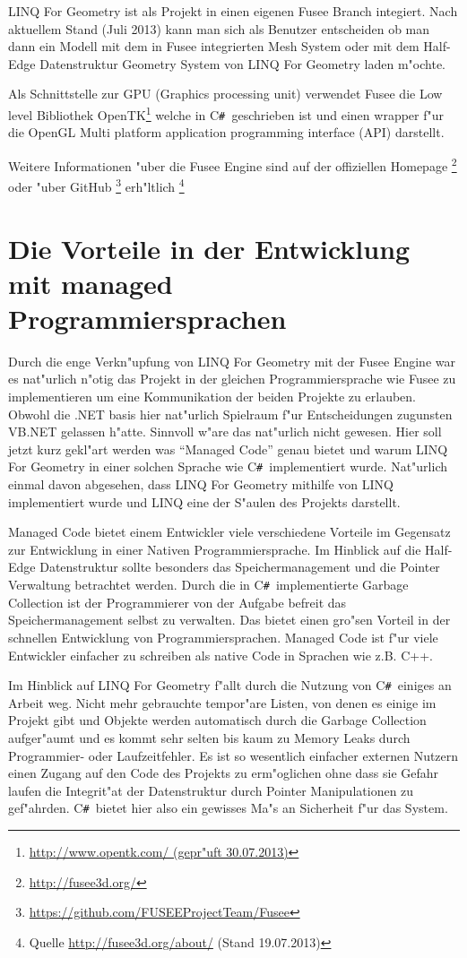 \documentclass[pagesize, paper=a4, fontsize=12pt,titlepage=true, headings=small, headnosepline, abstractoff, liststotoc, nochapterprefix, plainheadsepline]{scrreprt}
\newcommand{\CSS}{C\texttt{\# }}
\newcommand{\LFGS}{LINQ For Geometry }
\newcommand{\HES}{Half-Edge Datenstruktur }
\begin{document}
\LFGS ist als Projekt in einen eigenen Fusee Branch integiert. Nach aktuellem Stand (Juli 2013) kann man sich als Benutzer entscheiden ob man dann ein Modell mit dem in Fusee integrierten Mesh System oder mit dem \HES Geometry System von \LFGS laden m"ochte.

Als Schnittstelle zur GPU (Graphics processing unit) verwendet Fusee die Low level Bibliothek OpenTK\footnote{\url{http://www.opentk.com/ (gepr"uft 30.07.2013)}} welche in \CSS geschrieben ist und einen wrapper f"ur die OpenGL Multi platform application programming interface (API) darstellt.

Weitere Informationen "uber die Fusee Engine sind auf der offiziellen Homepage \footnote{\url{http://fusee3d.org/}} oder "uber GitHub \footnote{\url{https://github.com/FUSEEProjectTeam/Fusee}} erh"ltlich \footnote{Quelle \url{http://fusee3d.org/about/} (Stand 19.07.2013)}
\section {Die Vorteile in der Entwicklung mit managed Programmiersprachen}\label{sec:VorteileManaged}
Durch die enge Verkn"upfung von \LFGS mit der Fusee Engine war es nat"urlich n"otig das Projekt in der gleichen Programmiersprache wie Fusee zu implementieren um eine Kommunikation der beiden Projekte zu erlauben. Obwohl die .NET basis hier nat"urlich Spielraum f"ur Entscheidungen zugunsten VB.NET gelassen h"atte. Sinnvoll w"are das nat"urlich nicht gewesen. Hier soll jetzt kurz gekl"art werden was "`Managed Code"' genau bietet und warum \LFGS in einer solchen Sprache wie \CSS implementiert wurde. Nat"urlich einmal davon abgesehen, dass \LFGS mithilfe von LINQ implementiert wurde und LINQ eine der S"aulen des Projekts darstellt.

		Managed Code bietet einem Entwickler viele verschiedene Vorteile im Gegensatz zur Entwicklung in einer Nativen Programmiersprache. Im Hinblick auf die \HES sollte besonders das Speichermanagement und die Pointer Verwaltung betrachtet werden. Durch die in \CSS implementierte Garbage Collection ist der Programmierer von der Aufgabe befreit das Speichermanagement selbst zu verwalten. Das bietet einen gro"sen Vorteil in der schnellen Entwicklung von Programmiersprachen. Managed Code ist f"ur viele Entwickler einfacher zu schreiben als native Code in Sprachen wie z.B. C++.

Im Hinblick auf \LFGS f"allt durch die Nutzung von \CSS einiges an Arbeit weg. Nicht mehr gebrauchte tempor"are Listen, von denen es einige im Projekt gibt und Objekte werden automatisch durch die Garbage Collection aufger"aumt und es kommt sehr selten bis kaum zu Memory Leaks durch Programmier- oder Laufzeitfehler. Es ist so wesentlich einfacher externen Nutzern einen Zugang auf den Code des Projekts zu erm"oglichen ohne dass sie Gefahr laufen die Integrit"at der Datenstruktur durch Pointer Manipulationen zu gef"ahrden. \CSS bietet hier also ein gewisses Ma"s an Sicherheit f"ur das System.
\end{document}
